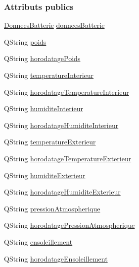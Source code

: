 \subsubsection*{Attributs publics}
\begin{DoxyCompactItemize}
\item 
\hyperlink{struct_donnees_batterie}{Donnees\+Batterie} \hyperlink{struct_donnees_ruche_a67dc57b9568529e595a5a31e93eef703}{donnees\+Batterie}
\item 
Q\+String \hyperlink{struct_donnees_ruche_af825ee2a3638e519d531c62311592d20}{poids}
\item 
Q\+String \hyperlink{struct_donnees_ruche_a8f96978c53a79f3c4b450240c67a306d}{horodatage\+Poids}
\item 
Q\+String \hyperlink{struct_donnees_ruche_ad6cbda133d2c8abc23fb688d6e565ab2}{temperature\+Interieur}
\item 
Q\+String \hyperlink{struct_donnees_ruche_a004c7a2447bbcdd2ba212ba2f9866dcd}{horodatage\+Temperature\+Interieur}
\item 
Q\+String \hyperlink{struct_donnees_ruche_a2541ee93816a11da7367b36d4bedc77b}{humidite\+Interieur}
\item 
Q\+String \hyperlink{struct_donnees_ruche_a15ebda778958380edd4acff5d6eef5b8}{horodatage\+Humidite\+Interieur}
\item 
Q\+String \hyperlink{struct_donnees_ruche_aebc52e7707ccf6ae31d2150533cfb0ba}{temperature\+Exterieur}
\item 
Q\+String \hyperlink{struct_donnees_ruche_a91fb0ab596625f4c63fed764dc649dfb}{horodatage\+Temperature\+Exterieur}
\item 
Q\+String \hyperlink{struct_donnees_ruche_ad97156720e4e08cd7aa545cdb8f3822f}{humidite\+Exterieur}
\item 
Q\+String \hyperlink{struct_donnees_ruche_af38a9a06e2f620850ba2d152f189f67b}{horodatage\+Humidite\+Exterieur}
\item 
Q\+String \hyperlink{struct_donnees_ruche_ad34347d2201eeae5834fd5dc4d0ed512}{pression\+Atmospherique}
\item 
Q\+String \hyperlink{struct_donnees_ruche_a21b7eeed18bc28b9c0f19f1ed5da7916}{horodatage\+Pression\+Atmospherique}
\item 
Q\+String \hyperlink{struct_donnees_ruche_adfa6aee15b2a96b968e558ac14e0f2de}{ensoleillement}
\item 
Q\+String \hyperlink{struct_donnees_ruche_ae1b5a2502017455f8fbd95bdab935fd1}{horodatage\+Ensoleillement}
\end{DoxyCompactItemize}


